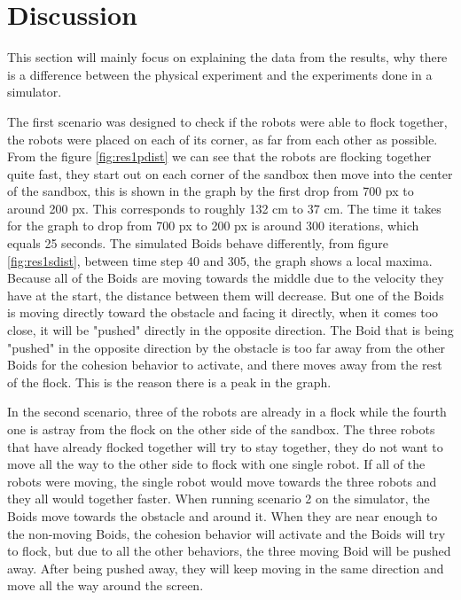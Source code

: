 \clearpage
\section{Discussion}
\label{sec:discussion}
This section will mainly focus on explaining the data from the results, why there is a difference between the physical experiment and the experiments done in a simulator.

The first scenario was designed to check if the robots were able to flock together, the robots were placed on each of its corner, as far from each other as possible.
From the figure \ref{fig:res1pdist} we can see that the robots are flocking together quite fast, they start out on each corner of the sandbox then move into the center of the sandbox, this is shown in the graph by the first drop from 700 px to around 200 px. This corresponds to roughly 132 cm to 37 cm. The time it takes for the graph to drop from 700 px to 200 px is around 300 iterations, which equals 25 seconds.
The simulated Boids behave differently, from figure \ref{fig:res1sdist}, between time step 40 and 305, the graph shows a local maxima. Because all of the Boids are moving towards the middle due to the velocity they have at the start, the distance between them will decrease. But one of the Boids is moving directly toward the obstacle and facing it directly, when it comes too close, it will be "pushed" directly in the opposite direction. The Boid that is being "pushed" in the opposite direction by the obstacle is too far away from the other Boids for the cohesion behavior to activate, and there moves away from the rest of the flock. This is the reason there is a peak in the graph.

In the second scenario, three of the robots are already in a flock while the fourth one is astray from the flock on the other side of the sandbox. The three robots that have already flocked together will try to stay together, they do not want to move all the way to the other side to flock with one single robot. If all of the robots were moving, the single robot would move towards the three robots and they all would together faster.
When running scenario 2 on the simulator, the Boids move towards the obstacle and around it. When they are near enough to the non-moving Boids, the cohesion behavior will activate and the Boids will try to flock, but due to all the other behaviors, the three moving Boid will be pushed away. After being pushed away, they will keep moving in the same direction and move all the way around the screen.

